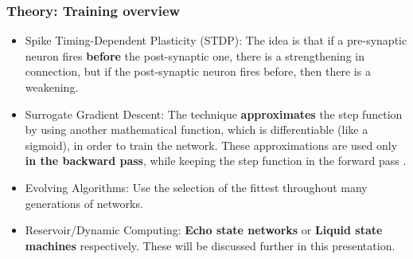 \begin{frame}
	\frametitle{Theory: Training overview}
	\begin{itemize}
		\item Spike Timing-Dependent Plasticity (STDP): The idea is that if a pre-synaptic neuron fires \textbf{before} the post-synaptic one, there is a strengthening in connection, but if the post-synaptic neuron fires before, then there is a weakening.
		\item Surrogate Gradient Descent: The technique \textbf{approximates} the step function by using another mathematical function, which is differentiable (like a sigmoid), in order to train the network. These approximations are used only \textbf{in the backward pass}, while keeping the step function in the forward pass \cite{kasabov2019time}.
		\item Evolving Algorithms: Use the selection of the fittest throughout many generations of networks.
		\item Reservoir/Dynamic Computing: \textbf{Echo state networks} or \textbf{Liquid state machines} respectively. These will be discussed further in this presentation.
	\end{itemize}
\end{frame}

